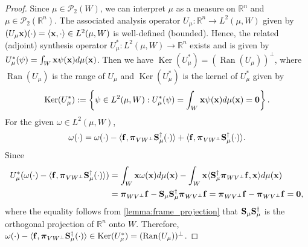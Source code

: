\documentclass{amsart}
\numberwithin{equation}{section}
\newcommand\R{{\mathbb R}}
\DeclareMathOperator{\kernel}{Ker}
\DeclareMathOperator{\range}{Ran}
\newcommand{\bpi}{{\boldsymbol{\pi}}}
\theoremstyle{plain}
\theoremstyle{remark}
\theoremstyle{definition}
\begin{document}
\begin{proof}
Since $\mu \in \mathcal{P}_2(W)$, we can interpret $\mu$ as a measure on $\R^n$ and $\mu \in \mathcal{P}_2(\mathbb{R}^n)$. The associated analysis operator $U_\mu: \mathbb{R}^n \rightarrow L^2(\mu, W)$ given by $(U_\mu{\bf x})(\cdot) = \langle {\bf x}, \cdot \rangle \in L^2(\mu, W)$ is well-defined (bounded). Hence, the related (adjoint) synthesis operator $U_\mu^*: L^2(\mu, W) \rightarrow \mathbb{R}^n$ exists and is given by $    U_\mu^*(\psi) = \int_{W} {\bf x}  \psi({\bf x}) d\mu({\bf x})$. Then we have
$\kernel(U_\mu^*) = (\range(U_\mu))^\perp$, where $\range(U_\mu)$ is the range of $U_\mu$ and  $\kernel(U_\mu^*)$ is the kernel of $U_\mu^*$ given by
\begin{equation*}
    \kernel(U_\mu^*) := \left\{\psi \in L^2(\mu, W): U_\mu^*(\psi) = \int_{W} {\bf x}  \psi({\bf x}) d\mu({\bf x}) = {\bf 0}\right\}.
\end{equation*}
For the given $\omega \in L^2(\mu, W)$, 
\begin{equation*}
        \omega(\cdot) = \omega(\cdot) - \langle {\bf f}, \bpi_{VW^\perp}{\bf S}_\mu^{\dagger} (\cdot) \rangle + \langle {\bf f}, \bpi_{VW^\perp}{\bf S}_\mu^{\dagger} (\cdot) \rangle. 
    \end{equation*}
Since 
\begin{equation*}
\begin{split}
     U_\mu^*(\omega(\cdot) - \langle {\bf f}, \bpi_{VW^\perp}{\bf S}_\mu^{\dagger} (\cdot) \rangle) &= \int_{W} {\bf x} \omega({\bf x})  d\mu({\bf x})  - \int_{W} {\bf x} \langle {\bf S}_\mu^{\dagger} \bpi_{WV^\perp}{\bf f},{\bf x} \rangle  d\mu({\bf x}) \\
         &= \bpi_{WV^\perp}{\bf f}-{\bf S}_\mu {\bf S}_\mu^{\dagger}\bpi_{WV^\perp}{\bf f}= \bpi_{WV^\perp}{\bf f}-\bpi_{WV^\perp}{\bf f}=\mathbf{0},
\end{split}
\end{equation*}
where the equality follows from \cref{lemma:frame_projection} that ${\bf S}_\mu {\bf S}_\mu^{\dagger}$ is the orthogonal projection of $\mathbb{R}^n$ onto $W$. 
Therefore, $\omega(\cdot) - \langle {\bf f}, \bpi_{VW^\perp}{\bf S}_\mu^{\dagger}(\cdot) \rangle \in \kernel( U_\mu^*) = (\range(U_\mu))^\perp$. 



\end{proof}
\end{document}
